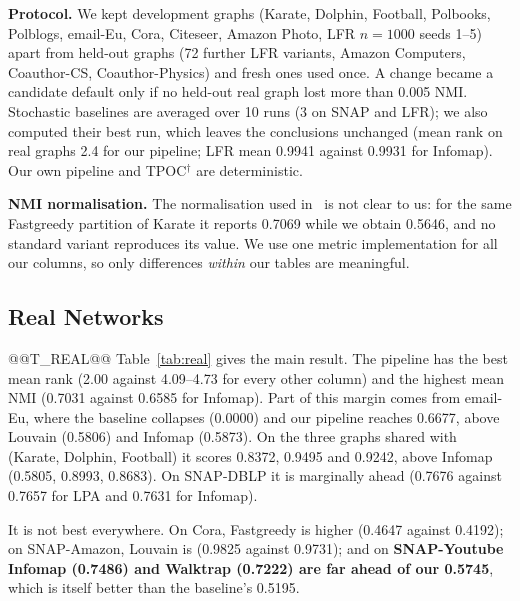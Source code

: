 \documentclass[conference]{IEEEtran}
\begin{document}
\textbf{Protocol.} We kept development graphs (Karate, Dolphin, Football, Polbooks, Polblogs, email-Eu, Cora, Citeseer, Amazon Photo, LFR $n{=}1000$ seeds 1--5) apart from held-out graphs (72 further LFR variants, Amazon Computers, Coauthor-CS, Coauthor-Physics) and fresh ones used once. A change became a candidate default only if no held-out real graph lost more than 0.005 NMI. Stochastic baselines are averaged over 10 runs (3 on SNAP and LFR); we also computed their best run, which leaves the conclusions unchanged (mean rank on real graphs 2.4 for our pipeline; LFR mean 0.9941 against 0.9931 for Infomap). Our own pipeline and TPOC$^{\dagger}$ are deterministic.

\textbf{NMI normalisation.} The normalisation used in~\cite{kong2026} is not clear to us: for the same Fastgreedy partition of Karate it reports 0.7069 while we obtain 0.5646, and no standard variant reproduces its value. We use one metric implementation for all our columns, so only differences \emph{within} our tables are meaningful.

\subsection{Real Networks}
@@T_REAL@@
Table~\ref{tab:real} gives the main result. The pipeline has the best mean rank (2.00 against 4.09--4.73 for every other column) and the highest mean NMI (0.7031 against 0.6585 for Infomap). Part of this margin comes from email-Eu, where the baseline collapses (0.0000) and our pipeline reaches 0.6677, above Louvain (0.5806) and Infomap (0.5873). On the three graphs shared with~\cite{kong2026} (Karate, Dolphin, Football) it scores 0.8372, 0.9495 and 0.9242, above Infomap (0.5805, 0.8993, 0.8683). On SNAP-DBLP it is marginally ahead (0.7676 against 0.7657 for LPA and 0.7631 for Infomap).

It is not best everywhere. On Cora, Fastgreedy is higher (0.4647 against 0.4192); on SNAP-Amazon, Louvain is (0.9825 against 0.9731); and on \textbf{SNAP-Youtube Infomap (0.7486) and Walktrap (0.7222) are far ahead of our 0.5745}, which is itself better than the baseline's 0.5195.
\end{document}
